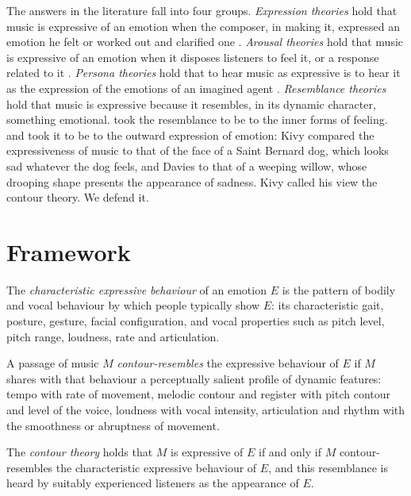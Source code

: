 \documentclass{situationist-preprint}
\begin{document}
The answers in the literature fall into four groups. \emph{Expression theories} hold that music is expressive of an emotion when the composer, in making it, expressed an emotion he felt \citep{Tolstoy1898} or worked out and clarified one \citep{Collingwood1938}. \emph{Arousal theories} hold that music is expressive of an emotion when it disposes listeners to feel it, or a response related to it \citep{Matravers1998}. \emph{Persona theories} hold that to hear music as expressive is to hear it as the expression of the emotions of an imagined agent \citep{Levinson1996,Robinson2005}. \emph{Resemblance theories} hold that music is expressive because it resembles, in its dynamic character, something emotional. \citet{Langer1942} took the resemblance to be to the inner forms of feeling. \citet{Kivy1980} and \citet{SDavies1994} took it to be to the outward expression of emotion: Kivy compared the expressiveness of music to that of the face of a Saint Bernard dog, which looks sad whatever the dog feels, and Davies to that of a weeping willow, whose drooping shape presents the appearance of sadness. Kivy called his view the contour theory. We defend it.

\section{Framework}

\begin{definition}\label{d:behav}
The \emph{characteristic expressive behaviour} of an emotion $E$ is the pattern of bodily and vocal behaviour by which people typically show $E$: its characteristic gait, posture, gesture, facial configuration, and vocal properties such as pitch level, pitch range, loudness, rate and articulation.
\end{definition}

\begin{definition}\label{d:res}
A passage of music $M$ \emph{contour-resembles} the expressive behaviour of $E$ if $M$ shares with that behaviour a perceptually salient profile of dynamic features: tempo with rate of movement, melodic contour and register with pitch contour and level of the voice, loudness with vocal intensity, articulation and rhythm with the smoothness or abruptness of movement.
\end{definition}

\begin{definition}\label{d:ct}
The \emph{contour theory} holds that $M$ is expressive of $E$ if and only if $M$ contour-resembles the characteristic expressive behaviour of $E$, and this resemblance is heard by suitably experienced listeners as the appearance of $E$.
\end{definition}
\end{document}
